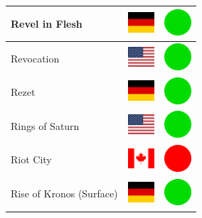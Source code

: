 \documentclass[12pt, a4paper, twoside]{report}
\begin{document}
\begin{center}
\begin{longtable}{|p{5cm}|p{2cm}|p{2cm}|}
Revel in Flesh & \includegraphics[width=1cm]{4x3/de} & \includegraphics[width=1cm]{likes/y} \\ \hline
Revocation & \includegraphics[width=1cm]{4x3/us} & \includegraphics[width=1cm]{likes/y} \\ \hline
Rezet & \includegraphics[width=1cm]{4x3/de} & \includegraphics[width=1cm]{likes/y} \\ \hline
Rings of Saturn & \includegraphics[width=1cm]{4x3/us} & \includegraphics[width=1cm]{likes/y} \\ \hline
Riot City & \includegraphics[width=1cm]{4x3/ca} & \includegraphics[width=1cm]{likes/n} \\ \hline
Rise of Kronos (Surface) & \includegraphics[width=1cm]{4x3/de} & \includegraphics[width=1cm]{likes/y} \\ \hline

\end{longtable}
\end{center}
\end{document}

